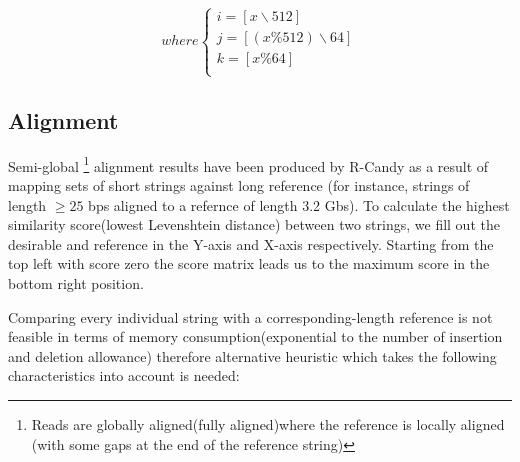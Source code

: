 \documentclass[11pt,a4paper]{report}
\begin{document}
\[ where
\begin{cases}
	i=[ x \backslash 512 ]\\
	j=[(x \% 512 )\backslash 64 ]\\
	k=[ x \% 64  ]\\
\end{cases}
\]


\subsection{Alignment}

Semi-global \footnote{Reads are globally aligned(fully aligned)where the reference is
locally aligned (with some gaps at the end of the reference string)} alignment results
have been produced by R-Candy as a result of mapping sets of short strings against 
long reference (for instance, strings of length $\geq 25$ bps aligned to a refernce of length 3.2 Gbs).
To calculate the highest similarity score(lowest Levenshtein distance) between two strings, 
we fill out the desirable and reference in the Y-axis and X-axis respectively.
Starting from the top left with score zero the score matrix leads us to the 
maximum score in the bottom right position.

Comparing every individual string with a corresponding-length reference is not feasible in
terms of memory consumption(exponential to the number of insertion and deletion allowance) 
therefore alternative heuristic which takes the following characteristics into account is needed: 
\end{document}
